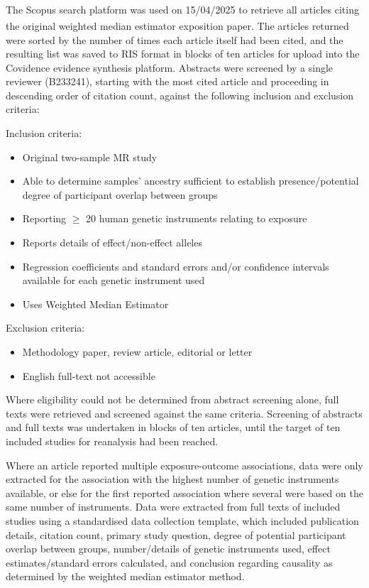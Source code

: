\documentclass[
]{article}
\begin{document}
The Scopus search platform\textsuperscript{} was used on 15/04/2025 to retrieve all articles citing the original weighted median estimator exposition paper\textsuperscript{}. The articles returned were sorted by the number of times each article itself had been cited, and the resulting list was saved to RIS format in blocks of ten articles for upload into the Covidence evidence synthesis platform. Abstracts were screened by a single reviewer (B233241), starting with the most cited article and proceeding in descending order of citation count, against the following inclusion and exclusion criteria:

Inclusion criteria:

\begin{itemize}
\item
  Original two-sample MR study
\item
  Able to determine samples' ancestry sufficient to establish presence/potential degree of participant overlap between groups
\item
  Reporting \(\ge\) 20 human genetic instruments relating to exposure
\item
  Reports details of effect/non-effect alleles
\item
  Regression coefficients and standard errors and/or confidence intervals available for each genetic instrument used
\item
  Uses Weighted Median Estimator
\end{itemize}

Exclusion criteria:

\begin{itemize}
\item
  Methodology paper, review article, editorial or letter
\item
  English full-text not accessible
\end{itemize}

Where eligibility could not be determined from abstract screening alone, full texts were retrieved and screened against the same criteria. Screening of abstracts and full texts was undertaken in blocks of ten articles, until the target of ten included studies for reanalysis had been reached.

Where an article reported multiple exposure-outcome associations, data were only extracted for the association with the highest number of genetic instruments available, or else for the first reported association where several were based on the same number of instruments. Data were extracted from full texts of included studies using a standardised data collection template, which included publication details, citation count, primary study question, degree of potential participant overlap between groups, number/details of genetic instruments used, effect estimates/standard errors calculated, and conclusion regarding causality as determined by the weighted median estimator method.
\end{document}
